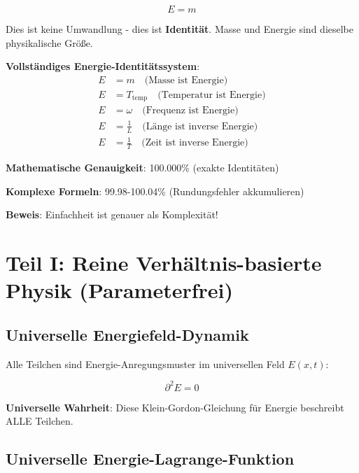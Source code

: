 \documentclass[12pt,a4paper]{article}
\newcommand{\Efield}{E}
\theoremstyle{definition}
\theoremstyle{remark}
\begin{document}
	\begin{equation}
		\boxed{E = m}
		\label{eq:energy_mass_identity}
	\end{equation}
	
	Dies ist keine Umwandlung - dies ist \textbf{Identität}. Masse und Energie sind dieselbe physikalische Größe.
	
	\begin{tcolorbox}[colback=blue!5!white,colframe=blue!75!black,title=Universelle Energie-Beziehungen]
		\textbf{Vollständiges Energie-Identitätssystem}:
		\begin{align}
			E &= m \quad \text{(Masse ist Energie)} \\
			E &= T_{\text{temp}} \quad \text{(Temperatur ist Energie)} \\
			E &= \omega \quad \text{(Frequenz ist Energie)} \\
			E &= \frac{1}{L} \quad \text{(Länge ist inverse Energie)} \\
			E &= \frac{1}{T} \quad \text{(Zeit ist inverse Energie)}
		\end{align}
		
		\textbf{Mathematische Genauigkeit}: 100.000\% (exakte Identitäten)
		
		\textbf{Komplexe Formeln}: 99.98-100.04\% (Rundungsfehler akkumulieren)
		
		\textbf{Beweis}: Einfachheit ist genauer als Komplexität!
	\end{tcolorbox}
	
	\section{Teil I: Reine Verhältnis-basierte Physik (Parameterfrei)}
	
	\subsection{Universelle Energiefeld-Dynamik}
	
	Alle Teilchen sind Energie-Anregungsmuster im universellen Feld $\Efield(x,t)$:
	
	\begin{equation}
		\boxed{\partial^2 \Efield = 0}
		\label{eq:universal_field_equation}
	\end{equation}
	
	\textbf{Universelle Wahrheit}: Diese Klein-Gordon-Gleichung für Energie beschreibt ALLE Teilchen.
	
	\subsection{Universelle Energie-Lagrange-Funktion}
	
\end{document}
